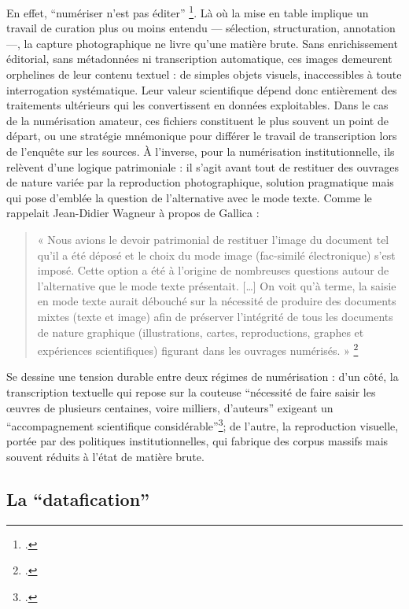 En effet, \enquote{numériser n’est pas éditer} \footcite[][]{bermesblog}. Là où la mise en table implique un travail de curation plus ou moins entendu — sélection, structuration, annotation —, la capture photographique ne livre qu’une matière brute. Sans enrichissement éditorial, sans métadonnées ni transcription automatique, ces images demeurent orphelines de leur contenu textuel : de simples objets visuels, inaccessibles à toute interrogation systématique. Leur valeur scientifique dépend donc entièrement des traitements ultérieurs qui les convertissent en données exploitables. Dans le cas de la numérisation amateur, ces fichiers constituent le plus souvent un point de départ, ou une stratégie mnémonique pour différer le travail de transcription lors de l’enquête sur les sources. À l’inverse, pour la numérisation institutionnelle, ils relèvent d’une logique patrimoniale : il s’agit avant tout de restituer des ouvrages de nature variée par la reproduction photographique, solution pragmatique mais qui pose d’emblée la question de l’alternative avec le mode texte. Comme le rappelait Jean-Didier Wagneur à propos de Gallica :

\begin{quote}
« Nous avions le devoir patrimonial de restituer l’image du document tel qu’il a été déposé et le choix du mode image (fac-similé électronique) s’est imposé. Cette option a été à l’origine de nombreuses questions autour de l’alternative que le mode texte présentait. […] On voit qu’à terme, la saisie en mode texte aurait débouché sur la nécessité de produire des documents mixtes (texte et image) afin de préserver l’intégrité de tous les documents de nature graphique (illustrations, cartes, reproductions, graphes et expériences scientifiques) figurant dans les ouvrages numérisés. » \footcite[][]{wagneur}

\end{quote}
Se dessine une tension durable entre deux régimes de numérisation : d’un côté, la transcription textuelle qui repose sur la couteuse \enquote{nécessité de faire saisir les œuvres de plusieurs centaines, voire milliers, d’auteurs} exigeant un \enquote{accompagnement scientifique considérable}\footcite[][]{wagneur}; de l’autre, la reproduction visuelle, portée par des politiques institutionnelles, qui fabrique des corpus massifs mais souvent réduits à l’état de matière brute.

\subsection{La \enquote{datafication}}

